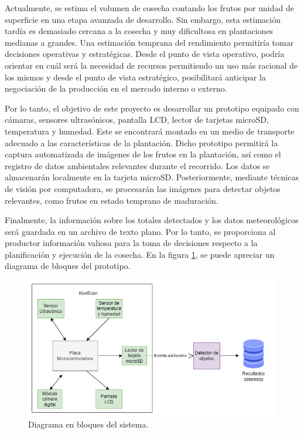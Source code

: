 \documentclass[
11pt, %
]{charter}
\begin{document}
Actualmente, se estima el volumen de cosecha contando los frutos por unidad de superficie en una etapa avanzada de desarrollo. Sin embargo, esta estimación tardía es demasiado cercana a la cosecha y muy dificultosa en plantaciones medianas a grandes. Una estimación temprana del rendimiento permitiría tomar decisiones operativas y estratégicas. Desde el punto de vista operativo, podría orientar en cuál será la necesidad de recursos permitiendo un uso más racional de los mismos y desde el punto de vista estratégico, posibilitará anticipar la negociación de la producción en el mercado interno o externo.

Por lo tanto, el objetivo de este proyecto es desarrollar un prototipo equipado con cámaras, sensores ultrasónicos, pantalla LCD, lector de tarjetas microSD, temperatura y humedad. Este se encontrará montado en un medio de transporte adecuado a las características de la plantación. Dicho prototipo permitirá la captura automatizada de imágenes de los frutos en la plantación, así como el registro de datos ambientales relevantes durante el recorrido. Los datos se almacenarán localmente en la tarjeta microSD. Posteriormente, mediante técnicas de visión por computadora, se procesarán las imágenes para detectar objetos relevantes, como frutos en estado temprano de maduración. 

Finalmente, la información sobre los totales detectados y los datos meteorológicos será guardada en un archivo de texto plano. Por lo tanto, se proporciona al productor información valiosa para la toma de decisiones respecto a la planificación y ejecución de la cosecha. En la figura \ref{fig:diagBloques}, se puede apreciar un diagrama de bloques del prototipo. 

\begin{figure}[htpb]
\centering 
\includegraphics[width=.90\textwidth]{./Figuras/KiwiScan.png}
\caption{Diagrama en bloques del sistema.}
\label{fig:diagBloques}
\end{figure}
\end{document}
